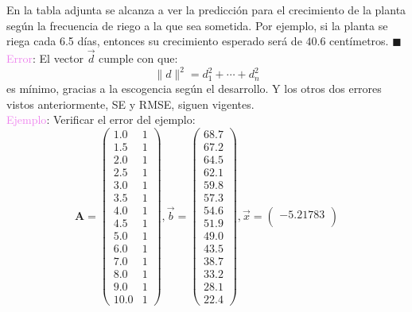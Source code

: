 \documentclass[11pt]{article}
\theoremstyle{definition}
\begin{document}
\begin{enumerate}[(i)]
En la tabla adjunta se alcanza a ver la predicci\'on para el crecimiento de la planta seg\'un la frecuencia de riego a la que sea sometida. Por ejemplo, si la planta se riega cada 6.5 d\'ias, entonces su crecimiento esperado ser\'a de $40.6$ cent\'imetros. $\blacksquare$\\
\vspace{2mm} %
\textcolor{violet}{Error}: El vector $\vec{d}$ cumple con que:
\begin{equation*}
\|d\|^{2} = d_{1}^{2} + \cdots + d_{n}^{2}
\end{equation*}
es m\'inimo, gracias a la escogencia seg\'un el desarrollo. Y los otros dos errores vistos anteriormente, SE y RMSE, siguen vigentes.\\
\vspace{2mm} %
\textcolor{violet}{Ejemplo}: Verificar el error del ejemplo:
\begin{equation*}
\textbf{A} =
\begin{pmatrix}
1.0 & 1\\
1.5 & 1\\
2.0 & 1\\
2.5 & 1\\
3.0 & 1\\
3.5 & 1\\
4.0 & 1\\
4.5 & 1\\
5.0 & 1\\
6.0 & 1\\
7.0 & 1\\
8.0 & 1\\
9.0 & 1\\
10.0 & 1
\end{pmatrix}, 
\vec{b} =
\begin{pmatrix}
68.7\\
67.2\\
64.5\\
62.1\\
59.8\\
57.3\\
54.6\\
51.9\\
49.0\\
43.5\\
38.7\\
33.2\\
28.1\\
22.4
\end{pmatrix}, 
\vec{x} =
\begin{pmatrix}
-5.21783\\

\end{pmatrix}
\end{equation*}
\end{enumerate}
\end{document}
